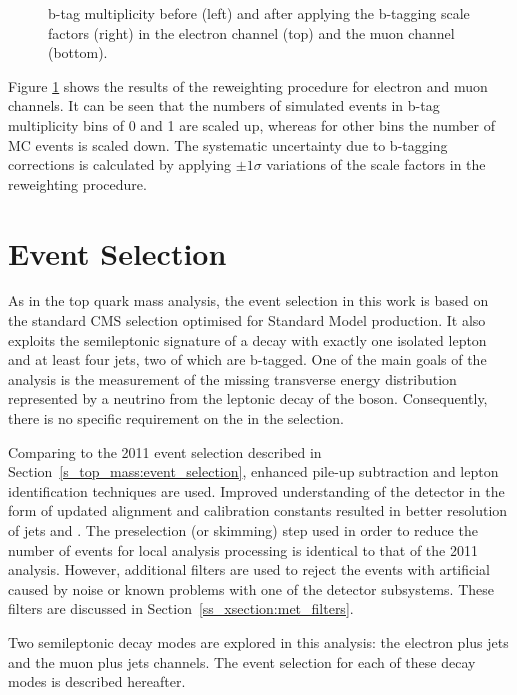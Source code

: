 \begin{figure}[!htpb]
    \caption[b-tag multiplicity before and after applying the b-tagging scale factors]{b-tag multiplicity before (left)
    and after applying the b-tagging scale factors (right) in the electron channel (top) and the muon channel (bottom).}
    \label{fig:bjet_weights}
\end{figure}

Figure \ref{fig:bjet_weights} shows the results of the reweighting procedure for electron and muon channels. It can be
seen that the numbers of simulated events in b-tag multiplicity bins of \num{0} and \num{1} are scaled up, whereas for
other bins the number of MC events is scaled down. The systematic uncertainty due to b-tagging corrections is calculated
by applying $\pm 1 \sigma$ variations of the scale factors in the reweighting procedure.

\section{Event Selection}
\label{s_xsection:event_selection}
As in the top quark mass analysis, the event selection in this work is based on the standard CMS selection optimised for
Standard Model \ttbar production. It also exploits the semileptonic signature of a \ttbar decay with exactly one
isolated lepton and at least four jets, two of which are b-tagged. One of the main goals of the analysis is the
measurement of the missing transverse energy distribution represented by a neutrino from the leptonic decay of the \W
boson. Consequently, there is no specific requirement on the \MET in the selection.

Comparing to the 2011 event selection described in Section~\ref{s_top_mass:event_selection}, enhanced pile-up
subtraction and lepton identification techniques are used. Improved understanding of the detector in the form of updated
alignment and calibration constants resulted in better resolution of jets and \MET. The preselection (or skimming) step
used in order to reduce the number of events for local analysis processing is identical to that of the 2011 analysis.
However, additional filters are used to reject the events with artificial \MET caused by noise or known problems with
one of the detector subsystems. These filters are discussed in Section~\ref{ss_xsection:met_filters}.

Two semileptonic \ttbar decay modes are explored in this analysis: the electron plus jets and the muon plus jets
channels. The event selection for each of these decay modes is described hereafter.

